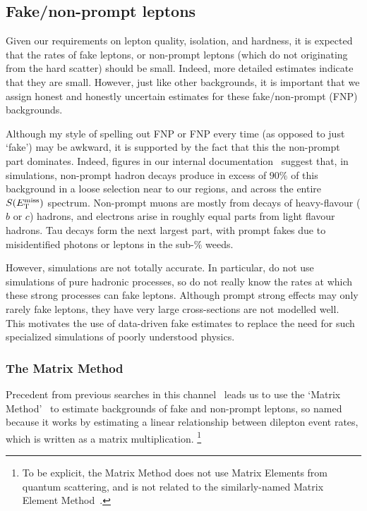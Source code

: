 \subsection{Fake/non-prompt leptons}
\label{sec:2ljets_mm_fakes}
Given our requirements on lepton quality, isolation, and hardness, it is
expected that the rates of fake leptons, or non-prompt leptons (which do not
originating from the hard scatter) should be small.
Indeed, more detailed estimates indicate that they are small.
However, just like other backgrounds, it is important that we assign
honest and honestly uncertain estimates for these fake/non-prompt (FNP)
backgrounds.

Although my style of spelling out FNP or FNP every time
(as opposed to just `fake') may be awkward, it is supported by the fact that this
the non-prompt part dominates.
Indeed, figures in our internal documentation~\cite{twoljets2018int} suggest
that, in simulations, non-prompt hadron decays produce in excess of $90\%$ of
this background in a loose selection near to our regions, and across the
entire $S(E_\mathrm{T}^\mathrm{miss})$ spectrum.
Non-prompt muons are mostly from decays of heavy-flavour ($b$ or $c$) hadrons,
and electrons arise in roughly equal parts from light flavour hadrons.
Tau decays form the next largest part, with prompt fakes due to misidentified
photons or leptons in the sub-$\%$ weeds.

However, simulations are not totally accurate.
In particular, do not use simulations of pure hadronic processes, so do not
really know the rates at which these strong processes can fake leptons.
Although prompt strong effects may only rarely fake leptons, they have very
large cross-sections are not modelled well.
This motivates the use of data-driven fake estimates to replace the need for
such specialized simulations of poorly understood physics.

\subsubsection{The Matrix Method}
Precedent from previous searches in this channel~\cite{
atlas_2l_SUSY_2013_11,
atlas_23l_SUSY_2016_24
}
leads us to use the `Matrix Method'~\cite{
ATLAS-CONF-2014-058,
D0:1999qdf
}%
to estimate
backgrounds of fake and non-prompt leptons, so named because it works by
estimating a linear relationship between dilepton event rates, which is
written as a matrix multiplication.%
\footnote{%
To be explicit, the Matrix Method does not use Matrix Elements from quantum
scattering, and is not related to the similarly-named
Matrix Element Method~\cite{gainer2013matrix}.
}

